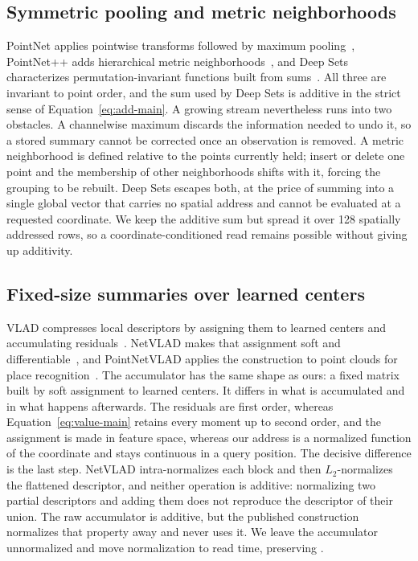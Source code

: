 \documentclass[11pt,a4paper]{article}
\begin{document}
\subsection{Symmetric pooling and metric neighborhoods}
PointNet applies pointwise transforms followed by maximum pooling~\cite{qi2017pointnet}, PointNet++ adds hierarchical metric neighborhoods~\cite{qi2017pointnetplusplus}, and Deep Sets characterizes permutation-invariant functions built from sums~\cite{zaheer2017deepsets}. All three are invariant to point order, and the sum used by Deep Sets is additive in the strict sense of Equation~\eqref{eq:add-main}. A growing stream nevertheless runs into two obstacles. A channelwise maximum discards the information needed to undo it, so a stored summary cannot be corrected once an observation is removed. A metric neighborhood is defined relative to the points currently held; insert or delete one point and the membership of other neighborhoods shifts with it, forcing the grouping to be rebuilt. Deep Sets escapes both, at the price of summing into a single global vector that carries no spatial address and cannot be evaluated at a requested coordinate. We keep the additive sum but spread it over 128 spatially addressed rows, so a coordinate-conditioned read remains possible without giving up additivity.

\subsection{Fixed-size summaries over learned centers}
VLAD compresses local descriptors by assigning them to learned centers and accumulating residuals~\cite{jegou2010vlad}. NetVLAD makes that assignment soft and differentiable~\cite{arandjelovic2016netvlad}, and PointNetVLAD applies the construction to point clouds for place recognition~\cite{uy2018pointnetvlad}. The accumulator has the same shape as ours: a fixed matrix built by soft assignment to learned centers. It differs in what is accumulated and in what happens afterwards. The residuals are first order, whereas Equation~\eqref{eq:value-main} retains every moment up to second order, and the assignment is made in feature space, whereas our address is a normalized function of the coordinate and stays continuous in a query position. The decisive difference is the last step. NetVLAD intra-normalizes each block and then $L_2$-normalizes the flattened descriptor, and neither operation is additive: normalizing two partial descriptors and adding them does not reproduce the descriptor of their union. The raw accumulator is additive, but the published construction normalizes that property away and never uses it. We leave the accumulator unnormalized and move normalization to read time, preserving .
\end{document}
